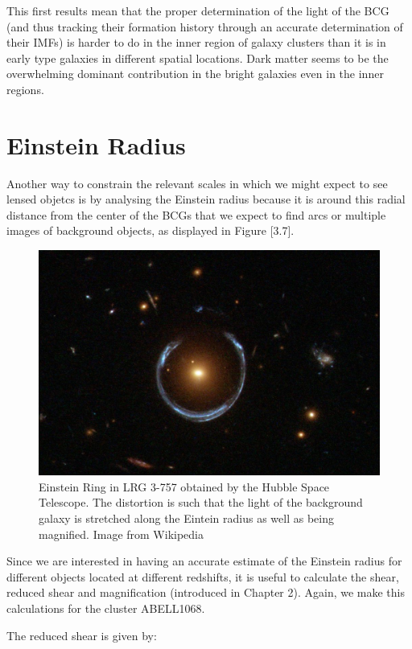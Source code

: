 This first results mean that the proper determination of the light of the BCG (and thus tracking their formation history through an accurate determination of their IMFs) is harder to do in the inner region of galaxy clusters than it is in early type galaxies in different spatial locations. Dark matter seems to be the overwhelming dominant contribution in the bright galaxies even in the inner regions.

\section{Einstein Radius}

Another way to constrain the relevant scales in which we might expect to see lensed objetcs is by analysing the Einstein radius because it is around this radial distance from the center of the BCGs that we expect to find arcs or multiple images of background objects, as displayed in Figure [3.7]. 

\begin{figure}[H]
\centering
\includegraphics[width=12cm]{images/einstein_ring_wiki.jpg}
\caption[Einstein Ring in LRG 3-757]{Einstein Ring in LRG 3-757 obtained by the Hubble Space Telescope. The distortion is such that the light of the background galaxy is stretched along the Eintein radius as well as being magnified. Image from Wikipedia}
\end{figure}

Since we are interested in having an accurate estimate of the Einstein radius for different objects located at different redshifts, it is useful to calculate the shear, reduced shear and magnification (introduced in Chapter 2). Again, we make this calculations for the cluster ABELL1068.

The reduced shear is given by:

